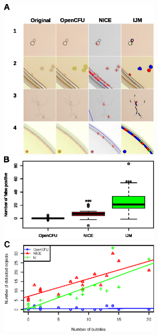 \documentclass[10pt]{article}
\begin{document}
\begin{figure}[!ht]
\begin{center}
\includegraphics[width=3.1in]{./fig5A.eps}
\includegraphics[width=3.1in]{./fig5B.eps}
\includegraphics[width=3.1in]{./fig5C.eps}
\end{center}


\end{figure}
\end{document}

